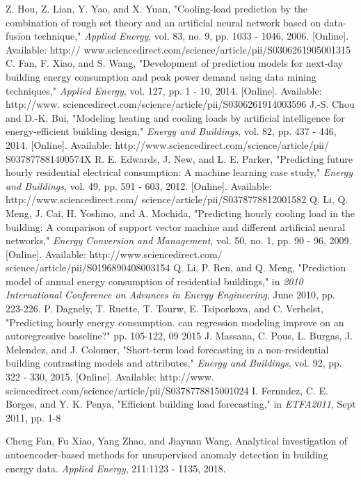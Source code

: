 \documentclass[conference]{IEEEtran}
\begin{document}
\begin{thebibliography}{00}
 Z. Hou, Z. Lian, Y. Yao, and X. Yuan, "Cooling-load prediction
by the combination of rough set theory and an artificial neural network based on data-fusion technique," \textit{Applied Energy},
vol. 83, no. 9, pp. 1033 - 1046, 2006. [Online]. Available: http://
	www.sciencedirect.com/science/article/pii/S0306261905001315
 C. Fan, F. Xiao, and S. Wang, "Development of prediction models for next-day building energy consumption and peak
power demand using data mining techniques," \textit{Applied Energy},
vol. 127, pp. 1 - 10, 2014. [Online]. Available: http://www.
	sciencedirect.com/science/article/pii/S0306261914003596
 J.-S. Chou and D.-K. Bui, "Modeling heating and cooling loads
by artificial intelligence for energy-efficient building design,"
\textit{Energy and Buildings}, vol. 82, pp. 437 - 446, 2014. [Online].
	Available: http://www.sciencedirect.com/science/article/pii/
	S037877881400574X
 R. E. Edwards, J. New, and L. E. Parker, "Predicting
future hourly residential electrical consumption: A machine
learning case study," \textit{Energy and Buildings}, vol. 49, pp. 591 -
	603, 2012. [Online]. Available: http://www.sciencedirect.com/
	science/article/pii/S0378778812001582
Q. Li, Q. Meng, J. Cai, H. Yoshino, and A. Mochida,
"Predicting hourly cooling load in the building: A comparison of
support vector machine and different artificial neural networks,"
\textit{Energy Conversion and Management}, vol. 50, no. 1, pp. 90
- 96, 2009. [Online]. Available: http://www.sciencedirect.com/
	science/article/pii/S0196890408003154
 Q. Li, P. Ren, and Q. Meng, "Prediction model of annual energy consumption of residential buildings," in \textit{2010 International
Conference on Advances in Energy Engineering}, June 2010, pp.
223-226.
P. Dagnely, T. Ruette, T. Tourw, E. Tsiporkova, and C. Verhelst,
"Predicting hourly energy consumption. can regression modeling
improve on an autoregressive baseline?" pp. 105-122, 09 2015
J. Massana, C. Pous, L. Burgas, J. Melendez, and J. Colomer,
"Short-term load forecasting in a non-residential building
contrasting models and attributes," \textit{Energy and Buildings},
vol. 92, pp. 322 - 330, 2015. [Online]. Available: http://www.
	sciencedirect.com/science/article/pii/S0378778815001024
 I. Fernndez, C. E. Borges, and Y. K. Penya, "Efficient building
load forecasting," in \textit{ETFA2011}, Sept 2011, pp. 1-8

Cheng Fan, Fu Xiao, Yang Zhao, and Jiayuan Wang. Analytical investigation of autoencoder-based methods for unsupervised anomaly detection in building energy data. \textit{Applied Energy},
211:1123 - 1135, 2018.


\end{thebibliography}
\end{document}
